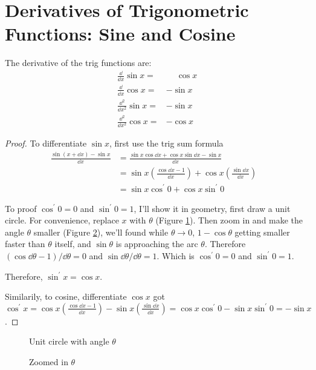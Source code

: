 \section{Derivatives of Trigonometric Functions: Sine and Cosine}
The derivative of the trig functions are:
\begin{align*}
  \frac\dd{\dd x}\sin x=       & \mathbin{\phantom-}\cos x\\
  \frac\dd{\dd x}\cos x=       & -\sin x\\
  \frac{\dd^2}{\dd x^2}\sin x= & -\sin x\\
  \frac{\dd^2}{\dd x^2}\cos x= & -\cos x
\end{align*}
\begin{proof}
To differentiate $\sin x$, first use the trig sum formula
\begin{align*}
  \frac{\sin(x+\dd x)-\sin x}{\dd x} & =\frac{\sin x\cos\dd x+\cos x\sin\dd x-\sin x}{\dd x} & \\
  & =\sin x\left(\frac{\cos\dd x-1}{\dd x}\right)+\cos x\left(\frac{\sin\dd x}{\dd x}\right)\\
  & =\sin x\cos^\prime0+\cos x\sin^\prime0
\end{align*}

To proof $\cos^\prime0=0$ and $\sin^\prime0=1$, I'll show it in geometry, first draw a unit circle. For convenience, replace $x$ with $\theta$ (Figure \ref{fig:1}). Then zoom in and make the angle $\theta$ smaller (Figure \ref{fig:2}), we'll found while $\theta\to0$, $1-\cos\theta$ getting smaller faster than $\theta$ itself, and \(\sin\theta\) is approaching the arc $\theta$. Therefore $(\cos\dd\theta-1)/\dd\theta=0$ and $\sin\dd\theta/\dd\theta=1$. Which is $\cos^\prime0=0$ and $\sin^\prime0=1$.

Therefore, $\sin^\prime x=\cos x$.

Similarily, to cosine, differentiate $\cos x$ got $\cos^\prime x=\cos x\left(\frac{\cos\dd x-1}{\dd x}\right)-\sin x\left(\frac{\sin\dd x}{\dd x}\right)=\cos x\cos^\prime 0-\sin x\sin^\prime 0=-\sin x$.
\end{proof}
\begin{figure}[H]
  \centering
  \caption{Unit circle with angle $\theta$}
  \label{fig:1}
\end{figure}
\begin{figure}[H]
  \centering
  \caption{Zoomed in $\theta$}
  \label{fig:2}
\end{figure}

